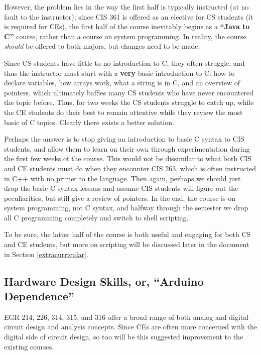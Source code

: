 \documentclass[12pt]{article}
\numberwithin{figure}{section}
\numberwithin{equation}{section}
\begin{document}
{\bigskip

However, the problem lies in the way the first half is typically
instructed (at no fault to the instructor); since CIS 361 is offered as
an elective for CS students (it is required for CEs), the first half of
the course inevitably begins as a \textbf{``Java to C''} course, rather
than a course on system programming. In reality, the course \emph{should} be offered to both majors, but changes need to be made.

\bigskip

Since CS students have little to no introduction to C, they often
struggle, and thus the instructor must start with a \textbf{very} basic
introduction to C: how to declare variables, how arrays work, what a
string is in C, and an overview of pointers, which ultimately baffles
many CS students who have never encountered the topic before. Thus, for
two weeks the CS students struggle to catch up, while the CE students do
their best to remain attentive while they review the most basic of C
topics. Clearly there exists a better solution.

\bigskip

Perhaps the answer is to stop giving an introduction to basic C syntax to CIS students, and allow them to learn on their own through experimentation during the first few weeks of the course. This would not be dissimilar to what both CIS and CE students must do when they encounter CIS 263, which is often instructed in C++ with no primer to the language. Then again, perhaps we should just drop the basic C syntax lessons and assume CIS students will figure out the peculiarities, but still give a review of pointers. In the end, the course is on system programming, not C syntax, and halfway through the semester we drop all C programming completely and switch to shell scripting.

\bigskip

To be sure, the latter half of the course is both useful and engaging
for both CS and CE students, but more on scripting will be discussed later in the document in Section \ref{extracurricular}.

\subsection{Hardware Design Skills, or, ``Arduino Dependence''}\label{arduino-dependence}
EGR 214, 226, 314, 315, and 316 offer a broad range of both analog and
digital circuit design and analysis concepts. Since CEs are often more
concerned with the digital side of circuit design, so too will be this
suggested improvement to the existing courses.

}
\end{document}
